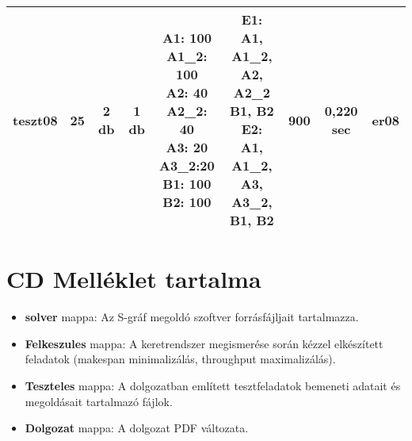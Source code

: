 \begin{table}
\begin{center}
\begin{sideways}
\begin{tabular}{|c|c|c|c|c|c|c|c|c|}
		\hline	
		teszt08 & 25 & 2 db & 1 db & \makecell{A1: 100 \\ A1\_2: 100\\A2: 40\\A2\_2: 40\\A3: 20\\A3\_2:20\\B1: 100\\B2: 100} & \makecell{E1: A1, A1\_2,\\A2, A2\_2 \\B1, B2 \\E2: A1, A1\_2,\\ A3, A3\_2, \\ B1, B2} & 900 & 0,220 sec & er08 \\
		\hline	
		\end{tabular}
	\end{sideways}
	\end{center}
\end{table}

\chapter{CD Melléklet tartalma}
\begin{itemize}
	\item[] \textbf{solver} mappa: Az S-gráf megoldó szoftver forrásfájljait tartalmazza.
	\item[] \textbf{Felkeszules} mappa: A keretrendszer megismerése során kézzel elkészített feladatok (makespan minimalizálás, throughput maximalizálás).
	\item[] \textbf{Teszteles} mappa: A dolgozatban említett tesztfeladatok bemeneti adatait és megoldásait tartalmazó fájlok.
	\item[] \textbf{Dolgozat} mappa: A dolgozat PDF változata.
\end{itemize}
